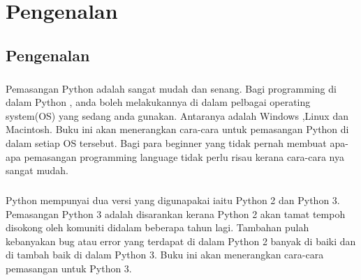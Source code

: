 \chapter{Pengenalan}

\section{Pengenalan}

\paragraph{}
	Pemasangan Python adalah sangat mudah dan senang. Bagi programming di dalam Python , anda boleh melakukannya di dalam pelbagai operating system(OS) yang sedang anda gunakan. Antaranya adalah Windows ,Linux dan Macintosh. Buku ini akan menerangkan cara-cara untuk pemasangan Python di dalam setiap OS tersebut. Bagi para beginner yang tidak pernah membuat apa-apa pemasangan programming language tidak perlu risau kerana cara-cara nya sangat mudah.
\paragraph{}
	Python mempunyai dua versi yang digunapakai iaitu Python 2 dan Python 3. Pemasangan Python 3 adalah disarankan kerana Python 2 akan tamat tempoh disokong oleh komuniti didalam beberapa tahun lagi. Tambahan pulah kebanyakan bug atau error yang terdapat di dalam Python 2 banyak di baiki dan di tambah baik di dalam Python 3. Buku ini akan menerangkan cara-cara pemasangan untuk Python 3.



